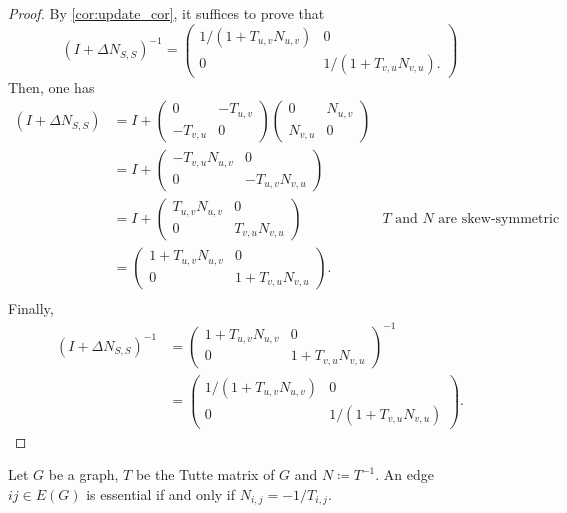\begin{proof}
By \cref{cor:update_cor}, it suffices to prove that 
\[
    (I + \Delta N_{S, S})^{-1} = 
    \begin{pmatrix}
        1 / (1 + T_{u, v}N_{u, v}) & 0 \\
        0 &  1 / (1 + T_{v, u}N_{v, u}).
    \end{pmatrix}
\]
Then, one has
\begin{align*}
    (I + \Delta N_{S, S}) &= I + 
    \begin{pmatrix} 0 & -T_{u,v} \\ -T_{v, u} & 0 \end{pmatrix} 
    \begin{pmatrix} 0 & N_{u, v} \\ N_{v, u} & 0\end{pmatrix} & \\
    &= I + 
    \begin{pmatrix} -T_{v, u}N_{u, v} & 0  \\ 0 & -T_{u, v}N_{v, u} \end{pmatrix} & \\
    &= I + 
    \begin{pmatrix} T_{u, v}N_{u, v} & 0  \\ 0 & T_{v, u}N_{v, u} \end{pmatrix} & \text{\(T\) and \(N\) are skew-symmetric} \\
    &= 
    \begin{pmatrix} 1 + T_{u, v}N_{u, v} & 0  \\ 0 & 1 + T_{v, u}N_{v, u} \end{pmatrix}. &  \\
\end{align*}
Finally, 
\begin{align*}
    (I + \Delta N_{S, S})^{-1} 
    &= \begin{pmatrix} 1 + T_{u, v}N_{u, v} & 0  \\ 0 & 1 + T_{v, u}N_{v, u} \end{pmatrix}^{-1} \\
    &= \begin{pmatrix} 1 / (1 + T_{u, v}N_{u, v}) & 0  \\ 0 & 1 / (1 + T_{v, u}N_{v, u}) \end{pmatrix}.
\end{align*}
\end{proof}

\begin{corollary}
    \label{cor:condition_edge_removal}
    Let \(G\) be a graph, \(T\) be the Tutte matrix of \(G\) and \(N \coloneqq T^{-1}\).
    An edge \(ij \in E(G)\) is essential if and only if \(N_{i,j} = -1/T_{i,j}\).
\end{corollary}

